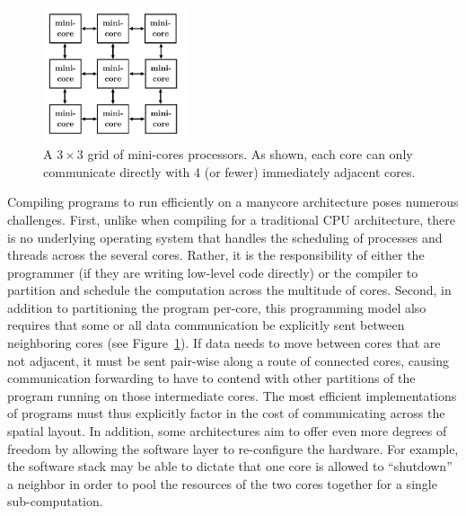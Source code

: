 \documentclass{sig-alternate-05-2015}
\newcommand{\note}{\color{red}$*$}
\begin{document}

\begin{figure}
\centering
\includegraphics[width=1.7in]{core-grid.png}
\caption{A $3 \times 3$ grid of mini-cores processors. As shown, each core can only communicate directly with 4 (or fewer) immediately adjacent cores.}
\label{fig:core-grid}
\end{figure}

Compiling programs to run efficiently on a manycore architecture poses numerous challenges. First, unlike when compiling for a traditional CPU architecture, there is no underlying operating system that handles the scheduling of processes and threads across the several cores. Rather, it is the responsibility of either the programmer (if they are writing low-level code directly) or the compiler to partition and schedule the computation across the multitude of cores. Second, in addition to partitioning the program per-core, this programming model also requires that some or all data communication be explicitly sent between neighboring cores (see Figure~\ref{fig:core-grid}). If data needs to move between cores that are not adjacent, it must be sent pair-wise along a route of connected cores, causing communication forwarding to have to contend with other partitions of the program running on those intermediate cores. The most efficient implementations of programs must thus explicitly factor in the cost of communicating across the spatial layout. In addition, some architectures aim to offer even more degrees of freedom by allowing the software layer to re-configure the hardware. For example, the software stack may be able to dictate that one core is allowed to ``shutdown'' a neighbor in order to pool the resources of the two cores together for a single sub-computation. 
\end{document}
